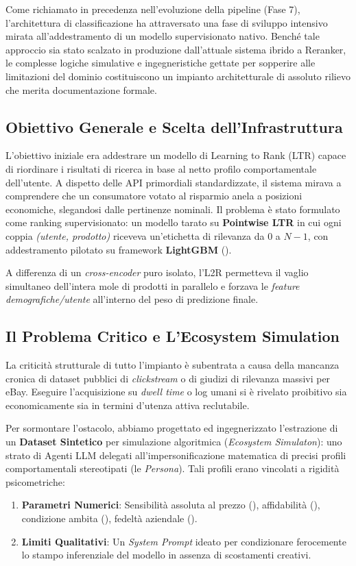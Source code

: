 Come richiamato in precedenza nell'evoluzione della pipeline (Fase 7), l'architettura di classificazione 
ha attraversato una fase di sviluppo intensivo mirata all'addestramento di un modello 
supervisionato nativo. Benché tale approccio sia stato scalzato in produzione dall'attuale sistema ibrido a Reranker, le complesse logiche simulative 
e ingegneristiche gettate per sopperire alle limitazioni del dominio costituiscono un impianto architetturale
di assoluto rilievo che merita documentazione formale.

\subsection{Obiettivo Generale e Scelta dell'Infrastruttura}
L'obiettivo iniziale era addestrare un modello di Learning to Rank (LTR) capace di riordinare i risultati di ricerca in base al netto profilo comportamentale dell'utente. A dispetto delle API primordiali standardizzate, il sistema mirava a comprendere che un consumatore votato al risparmio anela a posizioni economiche, slegandosi dalle pertinenze nominali. 
Il problema è stato formulato come ranking supervisionato: un modello tarato su \textbf{Pointwise LTR} in cui ogni coppia \emph{(utente, prodotto)} riceveva un'etichetta di rilevanza da $0$ a $N-1$, con addestramento pilotato su framework \textbf{LightGBM} ().

A differenza di un \textit{cross-encoder} puro isolato, l'L2R permetteva il vaglio simultaneo dell'intera mole di prodotti in parallelo e forzava le \textit{feature demografiche/utente} all'interno del peso di predizione finale.

\subsection{Il Problema Critico e L'Ecosystem Simulation}
La criticità strutturale di tutto l'impianto è subentrata a causa della mancanza cronica di dataset pubblici di \textit{clickstream} o di giudizi di rilevanza massivi per eBay. Eseguire l'acquisizione su \textit{dwell time} o log umani si è rivelato proibitivo sia economicamente sia in termini d'utenza attiva reclutabile.

Per sormontare l'ostacolo, abbiamo progettato ed ingegnerizzato l'estrazione di un \textbf{Dataset Sintetico} per simulazione algoritmica (\textit{Ecosystem Simulaton}): uno strato di Agenti LLM delegati all'impersonificazione matematica di precisi profili comportamentali stereotipati (le \textit{Persona}). Tali profili erano vincolati a rigidità psicometriche:
\begin{enumerate}
    \item \textbf{Parametri Numerici}: Sensibilità assoluta al prezzo (), affidabilità (), condizione ambita (), fedeltà aziendale ().
    \item \textbf{Limiti Qualitativi}: Un \textit{System Prompt} ideato per condizionare ferocemente lo stampo inferenziale del modello in assenza di scostamenti creativi.
\end{enumerate}

